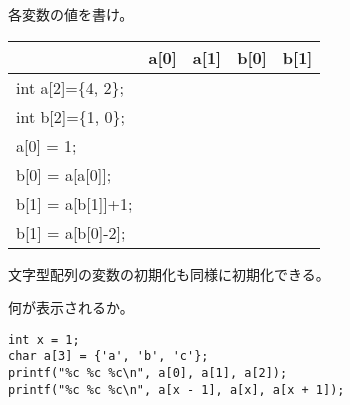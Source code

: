 \documentclass[12pt,a4j]{jarticle}
\newcounter{toi}
\def\toi{%
\bigskip\bigskip\noindent
\addtocounter{toi}{1}
\shadowbox{\bfseries\large 問\thetoi}
\nopagebreak[4]\bigskip\nopagebreak[4]
}
\begin{document}





\toi


各変数の値を書け。
\begin{center}\ttfamily%
 \begin{tabular}{|l|c|c|c|c|}\hline
  & a[0]& a[1]& b[0]& b[1]\\ \hline\hline
  int a[2]=\{4, 2\};& & & & \\ \cline{2-5}
  int b[2]=\{1, 0\};& & & & \\ \cline{2-5}
  a[0] = 1;& & & & \\ \cline{2-5}
  b[0] = a[a[0]];& & & & \\ \cline{2-5}
  b[1] = a[b[1]]+1;& & & & \\ \cline{2-5}
  b[1] = a[b[0]-2];& & & & \\ \hline
 \end{tabular}
\end{center}






\toi

文字型配列の変数の初期化も同様に初期化できる。

何が表示されるか。
\begin{verbatim}
int x = 1;
char a[3] = {'a', 'b', 'c'};
printf("%c %c %c\n", a[0], a[1], a[2]);
printf("%c %c %c\n", a[x - 1], a[x], a[x + 1]);
\end{verbatim}


\end{document}
